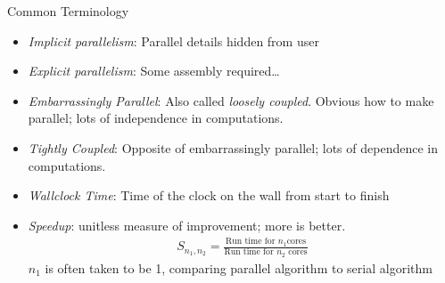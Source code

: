 \begin{frame}
  \begin{block}{Common Terminology}
    \begin{itemize}[<+-|alert@+>]
    \item \emph{Implicit parallelism}:  Parallel details hidden from user
    \item \emph{Explicit parallelism}:  Some assembly required\dots
    \item \emph{Embarrassingly Parallel}:  Also called \emph{loosely coupled}.  
      Obvious how to make parallel; lots of independence in computations.
    \item \emph{Tightly Coupled}:  Opposite of embarrassingly
      parallel; lots of dependence in computations.
    \item \emph{Wallclock Time}:  Time of the clock on the wall from
      start to finish
    \item \emph{Speedup}:  unitless measure of improvement; more is
      better. 
      \begin{align*}
        S_{n_1, n_2} =  \frac{\text{Run time for } n_1 \text{
        cores}}{\text{Run time  
        for } n_2 \text{ cores}}
      \end{align*}
      $n_1$ is often taken to be 1, comparing parallel algorithm to
      serial algorithm 
  \end{itemize}
  \end{block}
\end{frame}


